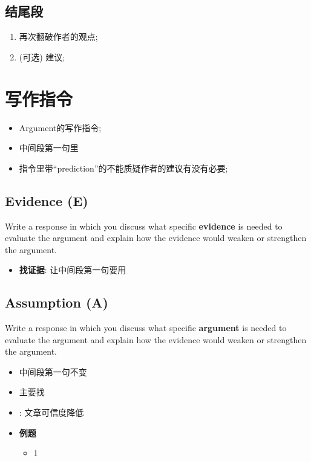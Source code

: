   \subsection{结尾段}

    \begin{enumerate}
      \item 再次翻破作者的观点;
      \item (可选) 建议;
    \end{enumerate}

\section{写作指令}

  \begin{itemize}
    \item Argument的写作指令;
    \item 中间段第一句里
    \item 指令里带“prediction”的不能质疑作者的建议有没有必要;
  \end{itemize}

  \subsection{Evidence (E)}

    Write a response in which you discuss what specific \textbf{evidence} is
    needed to evaluate the argument and explain how the evidence would weaken or
    strengthen the argument.

    \begin{itemize}
      \item \textbf{找证据}: 让中间段第一句要用
    \end{itemize}

  \subsection{Assumption (A)}

    Write a response in which you discuss what specific \textbf{argument} is
    needed to evaluate the argument and explain how the evidence would weaken or
    strengthen the argument.

    \begin{itemize}
      \item 中间段第一句不变
      \item 主要找 
      \item {}: 文章可信度降低
      \item \textbf{例题}
      \begin{itemize}
        \item 1
      \end{itemize}
    \end{itemize}

